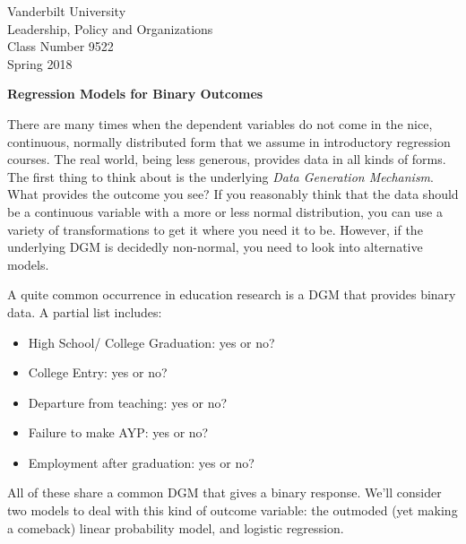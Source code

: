 \documentclass[12pt]{article}
\begin{document}
\thispagestyle{empty}%

\setlength{\parskip}{1ex plus 0.5ex minus 0.2ex}

\setcounter{secnumdepth}{-2}


\begin{flushleft}
Vanderbilt University\\Leadership, Policy and Organizations\\Class Number 9522\\ Spring 2018\\
\end{flushleft}

\begin{center}
\textbf{Regression Models for Binary Outcomes}
\end{center}


There are many times when the dependent variables do not come in the
nice, continuous, normally distributed form that we assume in
introductory regression courses. The real world, being less generous,
provides data in all kinds of forms. The first thing to think about is
the underlying \textit{Data Generation Mechanism}. What provides the
outcome you see? If you reasonably think that the data should be a
continuous variable with a more or less normal distribution, you can
use a variety of transformations to get it where you need it to
be. However, if the underlying DGM is decidedly non-normal, you need
to look into alternative models.

A quite common occurrence in education research is a DGM that provides
binary data. A partial list includes:

\begin{itemize}
\item High School/ College Graduation: yes or no?

\item College Entry: yes or no?

\item Departure from teaching: yes or no?

\item Failure to make AYP: yes or no?

\item Employment after graduation: yes or no?

\end{itemize}

All of these share a common DGM that gives a binary response. We'll
consider two models to deal with this kind of outcome variable: the
outmoded (yet making a comeback) linear probability model, and logistic regression. 
\end{document}
